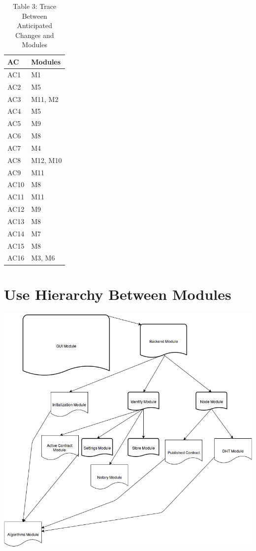 \documentclass{article}
\begin{document}
\begin{table}[h!]
	\centering
	\begin{tabular}{p{} p{}}
		\toprule
		\textbf{AC} & \textbf{Modules}\\
		\midrule
		AC1 & M1\\ 
		AC2 & M5\\
		AC3 & M11, M2\\
		AC4 & M5\\
		AC5 & M9\\
		AC6 & M8\\
		AC7 & M4\\
		AC8 & M12, M10\\
		AC9 & M11\\
		AC10 & M8\\
		AC11 & M11\\
		AC12 & M9\\
		AC13 & M8\\
		AC14 & M7\\
		AC15 & M8\\
		AC16 & M3, M6\\
		
		\bottomrule
	\end{tabular}
	\caption{Table 3: Trace Between Anticipated Changes and Modules}
	
\end{table}

\section*{Use Hierarchy Between Modules}
\includegraphics[scale=0.5]{use_hierarchy}
\end{document}
